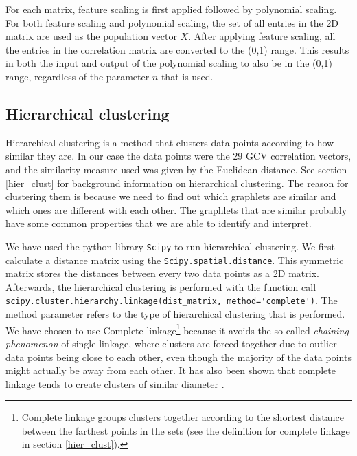 For each matrix, feature scaling is first applied followed by polynomial scaling. For both feature scaling and polynomial scaling, the set of all entries in the 2D matrix are used as the population vector $X$. After applying feature scaling, all the entries in the correlation matrix are converted to the (0,1) range. This results in both the input and output of the polynomial scaling to also be in the (0,1) range, regardless of the parameter $n$ that is used. 


\subsection{Hierarchical clustering}

Hierarchical clustering is a method that clusters data points according to how similar they are. In our case the data points were the 29 GCV correlation vectors, and the similarity measure used was given by the Euclidean distance. See section \ref{hier_clust} for background information on hierarchical clustering. The reason for clustering them is because we need to find out which graphlets are similar and which ones are different with each other. The graphlets that are similar probably have some common properties that we are able to identify and interpret.

We have used the python library \lstinline|Scipy| to run hierarchical clustering. We first calculate a distance matrix using the \lstinline|Scipy.spatial.distance|. This symmetric matrix stores the distances between every two data points as a 2D matrix. Afterwards, the hierarchical clustering is performed with the function call \lstinline|scipy.cluster.hierarchy.linkage(dist_matrix, method='complete')|. The method parameter refers to the type of hierarchical clustering that is performed. We have chosen to use Complete linkage\footnote{Complete linkage groups clusters together according to the shortest distance between the farthest points in the sets (see the definition for complete linkage in section \ref{hier_clust}).} because it avoids the so-called \emph{chaining phenomenon} of single linkage, where clusters are forced together due to outlier data points being close to each other, even though the majority of the data points might actually be away from each other. It has also been shown that complete 
linkage tends 
to create clusters of similar diameter \cite{everitt2001hierarchical}.

